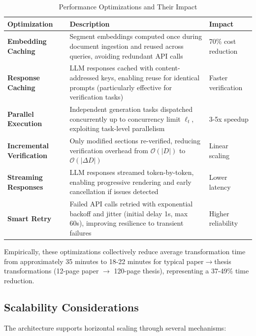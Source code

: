 \documentclass{ieeeaccess}
\begin{document}
\begin{table}[!t]
\caption{Performance Optimizations and Their Impact}
\label{tab:optimizations}
\centering
\renewcommand{\arraystretch}{1.3}
\begin{tabular}{p{3.5cm}p{7.5cm}p{2.5cm}}
\toprule
\textbf{Optimization} & \textbf{Description} & \textbf{Impact} \\
\midrule
\textbf{Embedding Caching} & Segment embeddings computed once during document ingestion and reused across queries, avoiding redundant API calls & 70\% cost reduction \\
\midrule
\textbf{Response Caching} & LLM responses cached with content-addressed keys, enabling reuse for identical prompts (particularly effective for verification tasks) & Faster verification \\
\midrule
\textbf{Parallel Execution} & Independent generation tasks dispatched concurrently up to concurrency limit \(\ell_t\), exploiting task-level parallelism & 3-5x speedup \\
\midrule
\textbf{Incremental Verification} & Only modified sections re-verified, reducing verification overhead from \(\mathcal{O}(|D|)\) to \(\mathcal{O}(|\Delta D|)\) & Linear scaling \\
\midrule
\textbf{Streaming Responses} & LLM responses streamed token-by-token, enabling progressive rendering and early cancellation if issues detected & Lower latency \\
\midrule
\textbf{Smart Retry} & Failed API calls retried with exponential backoff and jitter (initial delay 1s, max 60s), improving resilience to transient failures & Higher reliability \\
\bottomrule
\end{tabular}
\end{table}

Empirically, these optimizations collectively reduce average transformation time from approximately 35 minutes to 18-22 minutes for typical paper$\rightarrow$thesis transformations (12-page paper $\rightarrow$ 120-page thesis), representing a 37-49\% time reduction.

\subsection{Scalability Considerations}

The architecture supports horizontal scaling through several mechanisms:
\end{document}
